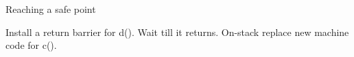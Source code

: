 \begin{frame}{Reaching a safe point}%
\hspace*{-3mm}
\begin{center}
\begin{block}{}
Install a return barrier for d(). Wait till it returns. On-stack replace
new machine code for c().
\end{block}
\end{center}
\end{frame}

% 
% 
% 
% 
